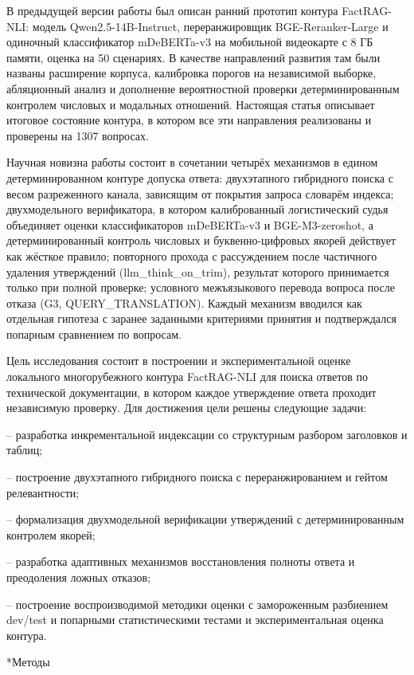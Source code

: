 \documentclass[14pt,a4paper]{extarticle}
\makeatletter
\renewcommand\section{\@startsection{section}{1}{\z@}{12pt plus 2pt}{6pt}{\normalfont\normalsize\bfseries\raggedright}}
\makeatother
\begin{document}
В предыдущей версии работы был описан ранний прототип контура FactRAG-NLI: модель Qwen2.5-14B-Instruct, переранжировщик BGE-Reranker-Large и одиночный классификатор mDeBERTa-v3 на мобильной видеокарте с 8 ГБ памяти, оценка на 50 сценариях. В качестве направлений развития там были названы расширение корпуса, калибровка порогов на независимой выборке, абляционный анализ и дополнение вероятностной проверки детерминированным контролем числовых и модальных отношений. Настоящая статья описывает итоговое состояние контура, в котором все эти направления реализованы и проверены на 1307 вопросах.

Научная новизна работы состоит в сочетании четырёх механизмов в едином детерминированном контуре допуска ответа: двухэтапного гибридного поиска с весом разреженного канала, зависящим от покрытия запроса словарём индекса; двухмодельного верификатора, в котором калиброванный логистический судья объединяет оценки классификаторов mDeBERTa-v3 и BGE-M3-zeroshot, а детерминированный контроль числовых и буквенно-цифровых якорей действует как жёсткое правило; повторного прохода с рассуждением после частичного удаления утверждений (llm\_think\_on\_trim), результат которого принимается только при полной проверке; условного межъязыкового перевода вопроса после отказа (G3, QUERY\_TRANSLATION). Каждый механизм вводился как отдельная гипотеза с заранее заданными критериями принятия и подтверждался попарным сравнением по вопросам.

Цель исследования состоит в построении и экспериментальной оценке локального многорубежного контура FactRAG-NLI для поиска ответов по технической документации, в котором каждое утверждение ответа проходит независимую проверку. Для достижения цели решены следующие задачи:

-- разработка инкрементальной индексации со структурным разбором заголовков и таблиц;\par
-- построение двухэтапного гибридного поиска с переранжированием и гейтом релевантности;\par
-- формализация двухмодельной верификации утверждений с детерминированным контролем якорей;\par
-- разработка адаптивных механизмов восстановления полноты ответа и преодоления ложных отказов;\par
-- построение воспроизводимой методики оценки с замороженным разбиением dev/test и попарными статистическими тестами и экспериментальная оценка контура.\par
\section*{Методы}
\end{document}
